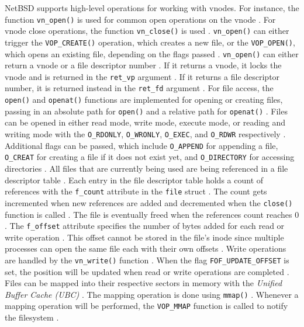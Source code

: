 NetBSD supports high-level operations for working with vnodes. For instance, the function \texttt{vn\_open()} is used for common
open operations on the vnode \parencite{netbsd_vnopen}. For vnode close operations, the function \texttt{vn\_close()} is used
\parencite{netbsd_vnopen}. \texttt{vn\_open()} can either trigger the \texttt{VOP\_CREATE()} operation, which creates a new file,
or the \texttt{VOP\_OPEN()}, which opens an existing file, depending on the flags passed \parencites{netbsd_vnopen}{netbsd_vopopen}.
\texttt{vn\_open()} can either return a vnode or a file descriptor number \parencite{netbsd_vnopen}. If it returns a vnode, it locks the
vnode and is returned in the \texttt{ret\_vp} argument \parencite{netbsd_vnopen}. If it returns a file descriptor number, it is returned
instead in the \texttt{ret\_fd} argument \parencite{netbsd_vnopen}. For file access, the \texttt{open()} and \texttt{openat()}
functions are implemented for opening or creating files, passing in an absolute path for \texttt{open()} and a relative path for
\texttt{openat()} \parencite{netbsd_open}. Files can be opened in either read mode, write mode, execute mode, or reading and writing
mode with the \texttt{O\_RDONLY}, \texttt{O\_WRONLY}, \texttt{O\_EXEC}, and \texttt{O\_RDWR} respectively \parencite{netbsd_open}.
Additional flags can be passed, which include \texttt{O\_APPEND} for appending a file, \texttt{O\_CREAT} for creating a file if
it does not exist yet, and \texttt{O\_DIRECTORY} for accessing directories \parencite{netbsd_open}. All files that are currently
being used are being referenced in a file descriptor table \parencite{netbsd_file}. Each entry in the file descriptor table
holds a count of references with the \texttt{f\_count} attribute in the \texttt{file} struct \parencite{netbsd_file}. The count gets
incremented when new references are added and decremented when the \texttt{close()} function is called \parencite{netbsd_file}.
The file is eventually freed when the references count reaches 0 \parencite{netbsd_file}. The \texttt{f\_offset} attribute specifies
the number of bytes added for each read or write operation \parencite{netbsd_file}. This offset cannot be stored in the file's inode
since multiple processes can open the same file each with their own offsets \parencite{netbsd_file}. Write operations are handled
by the \texttt{vn\_write()} function \parencite{netbsd_vnwrite}. When the flag \texttt{FOF\_UPDATE\_OFFSET} is set, the position
will be updated when read or write operations are completed \parencite{netbsd_vnwrite}. Files can be mapped into their respective
sectors in memory with the \textit{Unified Buffer Cache (UBC)} \parencite{netbsd_ubc}. The mapping operation is done using \texttt{mmap()}
\parencite{netbsd_mmap}. Whenever a mapping operation will be performed, the \texttt{VOP\_MMAP} function is called to notify the
filesystem \parencite{netbsd_vnodeops}.

